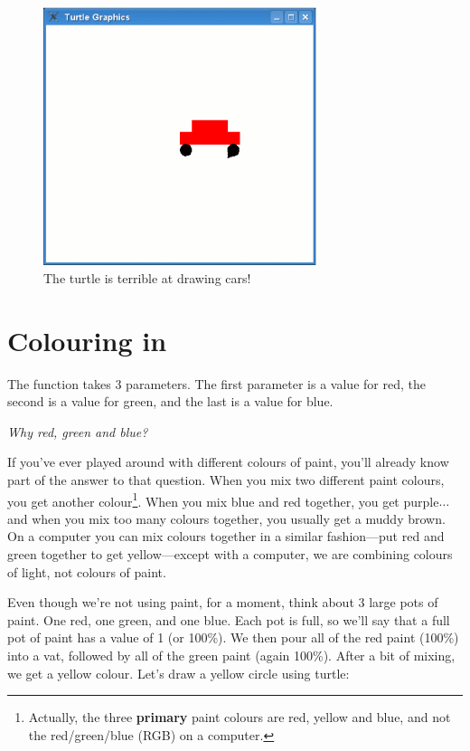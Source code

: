 \begin{figure}
\begin{center}
\includegraphics[width=80mm]{eps/figure24.eps}
\end{center}
\caption{The turtle is terrible at drawing cars!}\label{fig24}
\end{figure}

\section{Colouring in}

The  function takes 3 parameters. The first parameter is a value for red, the second is a value for green, and the last is a value for blue.
\par
\emph{Why red, green and blue?}
\par
If you've ever played around with different colours of paint, you'll already know part of the answer to that question.  When you mix two different paint colours, you get another colour\footnote{Actually, the three \textbf{primary} paint colours are red, yellow and blue, and not the red/green/blue (RGB) on a computer.}.  When you mix blue and red together, you get purple$\ldots$ and when you mix too many colours together, you usually get a muddy brown. On a computer you can mix colours together in a similar fashion---put red and green together to get yellow---except with a computer, we are combining colours of light, not colours of paint.
 
Even though we're not using paint, for a moment, think about 3 large pots of paint.  One red, one green, and one blue.  Each pot is full, so we'll say that a full pot of paint has a value of 1 (or 100\%).  We then pour all of the red paint (100\%) into a vat, followed by all of the green paint (again 100\%).  After a bit of mixing, we get a yellow colour.  Let's draw a yellow circle using turtle:

